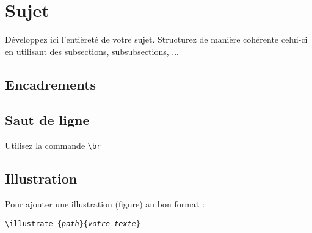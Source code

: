 \section{Sujet}
Développez ici l'entièreté de votre sujet.
Structurez de manière cohérente celui-ci en utilisant des subsections, subsubsections, ...

\subsection{Encadrements}




\subsection{Saut de ligne}

Utilisez la commande \texttt{\textbackslash br}

\subsection{Illustration}

Pour ajouter une illustration (figure) au bon format :

\texttt{\textbackslash illustrate \{\textit{path}\}\{\textit{votre texte}\}}

